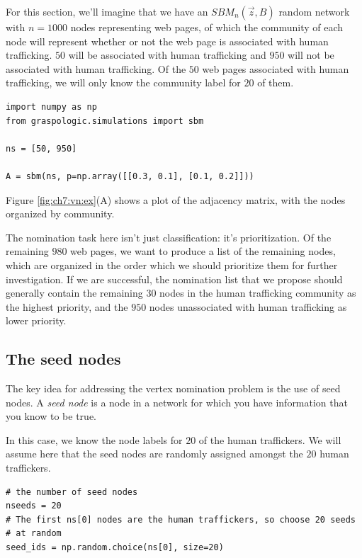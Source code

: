 For this section, we'll imagine that we have an $SBM_n(\vec z, B)$ random network with $n=1000$ nodes representing web pages, of which the community of each node will represent whether or not the web page is associated with human trafficking. $50$ will be associated with human trafficking and $950$ will not be associated with human trafficking. Of the $50$ web pages associated with human trafficking, we will only know the community label for $20$ of them. 

\begin{lstlisting}[style=python]
import numpy as np
from graspologic.simulations import sbm

ns = [50, 950]

A = sbm(ns, p=np.array([[0.3, 0.1], [0.1, 0.2]]))
\end{lstlisting}

Figure \ref{fig:ch7:vn:ex}(A) shows a plot of the adjacency matrix, with the nodes organized by community. 



The nomination task here isn't just classification: it's prioritization. Of the remaining $980$ web pages, we want to produce a list of the remaining nodes, which are organized in the order which we should prioritize them for further investigation. If we are successful, the nomination list that we propose should generally contain the remaining $30$ nodes in the human trafficking community as the highest priority, and the $950$ nodes unassociated with human trafficking as lower priority.


\subsection{The seed nodes}

The key idea for addressing the vertex nomination problem is the use of seed nodes. A \textit{seed node} is a node in a network for which you have information that you know to be true. 

In this case, we know the node labels for $20$ of the human traffickers. We will assume here that the seed nodes are randomly assigned amongst the $20$ human traffickers.

\begin{lstlisting}[style=python]
# the number of seed nodes
nseeds = 20
# The first ns[0] nodes are the human traffickers, so choose 20 seeds
# at random
seed_ids = np.random.choice(ns[0], size=20)
\end{lstlisting}

